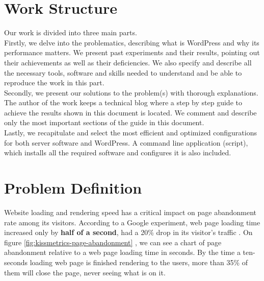\section{Work Structure}

Our work is divided into three main parts.  \\

Firstly, we delve into the problematics, describing what is WordPress and why its performance matters. We present past experiments and their results, pointing out their achievements as well as their deficiencies. We also specify and describe all the necessary tools, software and skills needed to understand and be able to reproduce the work in this part. \\

Secondly, we present our solutions to the problem(s) with thorough explanations. The author of the work keeps a technical blog \cite{Lamosty.com:Blog} where a step by step guide to achieve the results shown in this document is located. We comment and describe only the most important sections of the guide in this document. \\

Lastly, we recapitulate and select the most efficient and optimized configurations for both server software and WordPress. A command line application (script), which installs all the required software and configures it is also included.

\section{Problem Definition}

Website loading and rendering speed has a critical impact on page abandonment rate among its visitors. According to a Google experiment, web page loading time increased only by \textbf{half of a second}, had a 20\% drop in its visitor’s traffic \cite{KISSmetrics:Speed-Google}. On figure \ref{fig:kissmetrics-page-abandonment} \cite{Fig:Kissmetrics-page-abandonment}, we can see a chart of page abandonment relative to a web page loading time in seconds. By the time a ten-seconds loading web page is finished rendering to the users, more than 35\% of them will close the page, never seeing what is on it.

